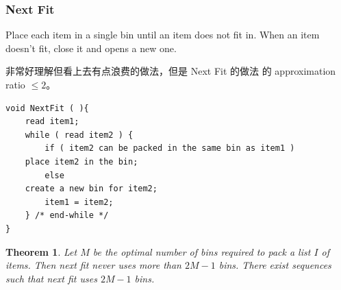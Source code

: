 \documentclass{article}
\newtheorem*{Theorem}{Theorem}
\begin{document}
\subsubsection{Next Fit}
Place each item in a single bin until an item does not fit in. When an item doesn't fit, close it and opens a new one.\par
非常好理解但看上去有点浪费的做法，但是 Next Fit 的做法 的 approximation ratio $\le 2$。
\begin{lstlisting}
void NextFit ( ){
    read item1;
    while ( read item2 ) {
        if ( item2 can be packed in the same bin as item1 )
    place item2 in the bin;
        else
    create a new bin for item2;
        item1 = item2;
    } /* end-while */
}
\end{lstlisting}

\begin{Theorem}
    Let $M$ be the optimal number of bins required to pack a list $I$ of items.  Then next fit never uses more than $2M - 1$ bins.  There exist sequences such that next fit uses $2M - 1$ bins.
\end{Theorem}
\end{document}
